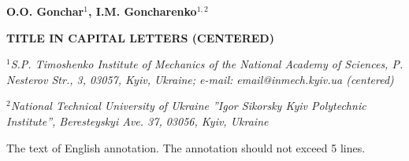 \documentclass[a4paper,10pt]{article}
\begin{document}
\begin{center}
\textbf{O.O. Gonchar$^1$, I.M. Goncharenko$^{1,2}$}

\textbf{TITLE IN CAPITAL LETTERS (CENTERED)}

\textit{\fontsize{9}{9}\selectfont$^1$S.P. Timoshenko Institute of Mechanics of the National Academy of Sciences, P. Nesterov Str., 3, 03057, Kyiv, Ukraine;
e-mail: email@inmech.kyiv.ua (centered)}

\textit{\fontsize{9}{9}\selectfont
$^2$National Technical University of Ukraine ''Igor Sikorsky Kyiv Polytechnic Institute'', Beresteyskyi Ave. 37, 03056, Kyiv, Ukraine}
\end{center}

The text of English annotation. The annotation should not exceed 5 lines.
\end{document}
